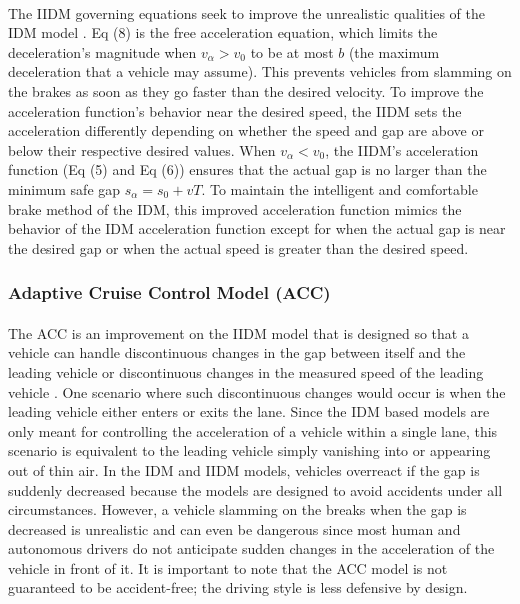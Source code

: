 \documentclass[12pt]{article}
\begin{document}
\paragraph{}
The IIDM governing equations seek to improve the unrealistic qualities of the IDM model \cite{intelligent_driver_model}. Eq (8) is the free acceleration equation, which limits the deceleration's magnitude when $v_\alpha>v_0$ to be at most $b$ (the maximum deceleration that a vehicle may assume). This prevents vehicles from slamming on the brakes as soon as they go faster than the desired velocity.  To improve the acceleration function's behavior near the desired speed, the IIDM sets the acceleration differently depending on whether the speed and gap are above or below their respective desired values.  When $v_\alpha < v_0$, the IIDM's acceleration function (Eq (5) and Eq (6)) ensures that the actual gap is no larger than the minimum safe gap $s_\alpha = s_0+vT$.  To maintain the intelligent and comfortable brake method of the IDM, this improved acceleration function mimics the behavior of the IDM acceleration function except for when the actual gap is near the desired gap or when the actual speed is greater than the desired speed.
\subsubsection{Adaptive Cruise Control Model (ACC)}
\paragraph{}
The ACC is an improvement on the IIDM model that is designed so that a vehicle can handle discontinuous changes in the gap between itself and the leading vehicle or discontinuous changes in the measured speed of the leading vehicle \cite[chapter~11]{treiber_kesting_2013}.  One scenario where such discontinuous changes would occur is when the leading vehicle either enters or exits the lane.  Since the IDM based models are only meant for controlling the acceleration of a vehicle within a single lane, this scenario is equivalent to the leading vehicle simply vanishing into or appearing out of thin air.  In the IDM and IIDM models, vehicles overreact if the gap is suddenly decreased because the models are designed to avoid accidents under all circumstances.  However, a vehicle slamming on the breaks when the gap is decreased is unrealistic and can even be dangerous since most human and autonomous drivers do not anticipate sudden changes in the acceleration of the vehicle in front of it.  It is important to note that the ACC model is not guaranteed to be accident-free; the driving style is less defensive by design. \cite{loos_platzer_nistor_2011}
\end{document}
